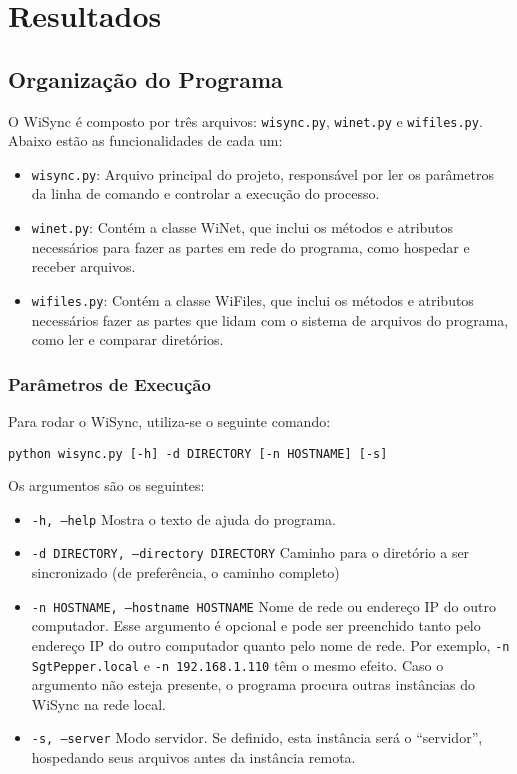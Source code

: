 \chapter{Resultados}
\label{resultados}

\section{Organização do Programa}
O WiSync é composto por três arquivos: \texttt{wisync.py}, \texttt{winet.py} e \texttt{wifiles.py}. Abaixo estão as funcionalidades de cada um:
\begin{itemize}
  \item \texttt{wisync.py}: Arquivo principal do projeto, responsável por ler os parâmetros da linha de comando e controlar a execução do processo.
  \item \texttt{winet.py}: Contém a classe WiNet, que inclui os métodos e atributos necessários para fazer as partes em rede do programa, como hospedar e receber arquivos.
  \item \texttt{wifiles.py}: Contém a classe WiFiles, que inclui os métodos e atributos necessários fazer as partes que lidam com o sistema de arquivos do programa, como ler e comparar diretórios.
\end{itemize}

\subsection{Parâmetros de Execução}

Para rodar o WiSync, utiliza-se o seguinte comando:
\begin{verbatim}
python wisync.py [-h] -d DIRECTORY [-n HOSTNAME] [-s]
\end{verbatim}

Os argumentos são os seguintes:
\begin{itemize}
  \item \texttt{-h, --help} Mostra o texto de ajuda do programa.
  \item \texttt{-d DIRECTORY, --directory DIRECTORY} Caminho para o diretório a ser sincronizado (de preferência, o caminho completo)
  \item \texttt{-n HOSTNAME, --hostname HOSTNAME} Nome de rede ou endereço IP do outro computador. Esse argumento é opcional e pode ser preenchido tanto pelo endereço IP do outro computador quanto pelo nome de rede. Por exemplo, \texttt{-n SgtPepper.local} e \texttt{-n 192.168.1.110} têm o mesmo efeito. Caso o argumento não esteja presente, o programa procura outras instâncias do WiSync na rede local.
  \item \texttt{-s, --server} Modo servidor. Se definido, esta instância será o ``servidor'', hospedando seus arquivos antes da instância remota.
\end{itemize}

